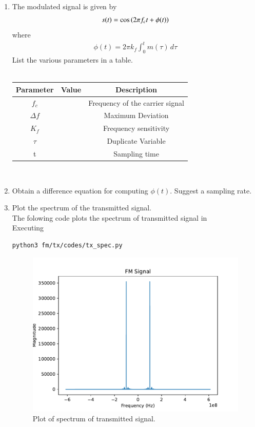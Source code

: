 \begin{enumerate}[label=\arabic*.,ref=\thesection.\theenumi]
\item The modulated signal is given by 
\begin{align}
	s(t) = \cos\left(2\pi f_c t + \phi(t)\right)
\end{align}
where
\begin{align}
	\phi(t) = 2\pi k_f \int_{0}^{t}m(\tau)\,d\tau
\end{align}
List the various parameters in a table.
\\
\solution
\\
\begin{tabular}{|c|l|c|}
    \hline 
    \textbf{Parameter} & \textbf{Value} &\textbf{Description} \\ \hline
    $f_c $&  & Frequency of the carrier signal\\
    $\Delta{f}$ &  & Maximum Deviation \\  
    $K_{f}$ &  & Frequency sensitivity \\ 
    $\tau$ &  & Duplicate Variable\\ 
    t     &  & Sampling time\\  \hline
    \end{tabular}
    \\
\item Obtain a difference equation for computing $\phi(t)$.  Suggest a sampling rate.
\\
\solution
\item Plot the spectrum of the transmitted signal.
\\
\solution
The folowing code plots the spectrum of transmitted signal in 
\\
Executing
\begin{lstlisting}
python3 fm/tx/codes/tx_spec.py
\end{lstlisting}
\begin{figure}[H]
\centering	
\includegraphics[width=\columnwidth]{fm/tx/figs/tx_spec.pdf} 
\caption{Plot of spectrum of transmitted signal.}
\label{fig:Trans}
\end{figure}


\end{enumerate}
